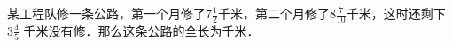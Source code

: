 
某工程队修一条公路，第一个月修了$7\frac{1}{2}$千米，第二个月修了$8\frac{7}{10}$千米，这时还剩下$3\frac{4}{5}$ 千米没有修．那么这条公路的全长为\key{\hspace{4em}}千米．\\

